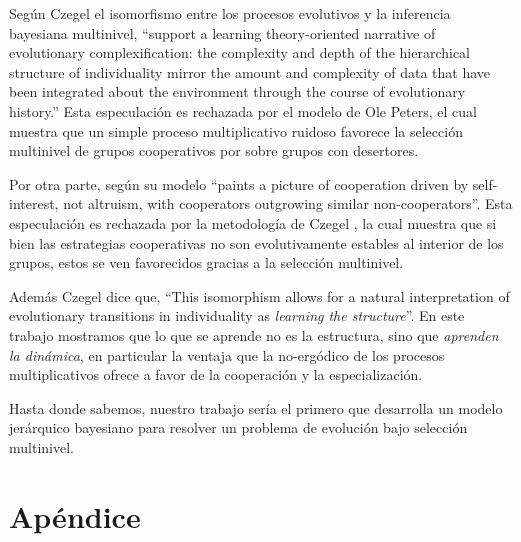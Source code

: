 \documentclass[a4paper,10pt]{article}
\begin{document}
Según Czegel \cite{czegel2019-bayesianEvolution} el isomorfismo entre los procesos evolutivos y la inferencia bayesiana multinivel,  ``support a learning theory-oriented narrative of evolutionary complexification: the complexity and depth of the hierarchical structure of individuality mirror the amount and complexity of data that have been integrated about the environment through the course of evolutionary history.''
Esta especulación es rechazada por el modelo de Ole Peters, el cual muestra que un simple proceso multiplicativo ruidoso favorece la selección multinivel de grupos cooperativos por sobre grupos con desertores.

Por otra parte, según \cite{peters-cooperation2019.03.04} su modelo ``paints a picture of cooperation driven by self-interest, not altruism, with cooperators outgrowing similar non-cooperators''.
Esta especulación es rechazada por la metodología de Czegel \cite{czegel2019-bayesianEvolution}, la cual muestra que si bien las estrategias cooperativas no son evolutivamente estables al interior de los grupos, estos se ven favorecidos gracias a la selección multinivel.

Además Czegel \cite{czegel2019-bayesianEvolution} dice que, ``This isomorphism allows for a natural interpretation of evolutionary transitions in individuality as \emph{learning the structure}''.
En este trabajo mostramos que lo que se aprende no es la estructura, sino que \emph{aprenden la dinámica}, en particular la ventaja que la no-ergódico de los procesos multiplicativos ofrece a favor de la cooperación y la especialización.


Hasta donde sabemos, nuestro trabajo sería el primero que desarrolla un modelo jerárquico bayesiano para resolver un problema de evolución bajo selección multinivel.



{\footnotesize


}

\section{Apéndice}
\end{document}
